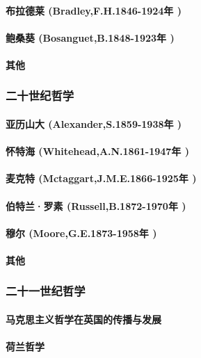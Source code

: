 \documentclass[UTF8]{../RepresentationUniverse}
\begin{document}
    \paragraph{布拉德莱 (Bradley,F.H.1846-1924年 )}
    \paragraph{鲍桑葵 (Bosanguet,B.1848-1923年 )}
    \paragraph{其他}

\subsubsection{二十世纪哲学}
    \paragraph{亚历山大 (Alexander,S.1859-1938年 )}
    \paragraph{怀特海 (Whitehead,A.N.1861-1947年 )}
    \paragraph{麦克特 (Mctaggart,J.M.E.1866-1925年 )}
    \paragraph{伯特兰·罗素 (Russell,B.1872-1970年 )}
    \paragraph{穆尔 (Moore,G.E.1873-1958年 )}
    \paragraph{其他}

\subsubsection{二十一世纪哲学}
    \paragraph{马克思主义哲学在英国的传播与发展}
    \paragraph{荷兰哲学}
\end{document}
